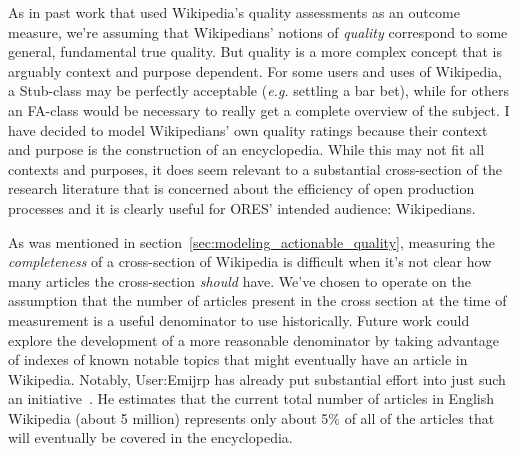 As in past work that used Wikipedia's quality assessments as an outcome measure, we're assuming that Wikipedians' notions of \emph{quality} correspond to some general, fundamental true quality.  But quality is a more complex concept that is arguably context and purpose dependent.  For some users and uses of Wikipedia, a Stub-class may be perfectly acceptable (\emph{e.g.} settling a bar bet), while for others an FA-class would be necessary to really get a complete overview of the subject.  I have decided to model Wikipedians' own quality ratings because their context and purpose is the construction of an encyclopedia.  While this may not fit all contexts and purposes, it does seem relevant to a substantial cross-section of the research literature that is concerned about the efficiency of open production processes and it is clearly useful for ORES' intended audience: Wikipedians.

As was mentioned in section~\ref{sec:modeling_actionable_quality}, measuring the \emph{completeness} of a cross-section of Wikipedia is difficult when it's not clear how many articles the cross-section \emph{should} have.  We've chosen to operate on the assumption that the number of articles present in the cross section at the time of measurement is a useful denominator to use historically.  Future work could explore the development of a more reasonable denominator by taking advantage of indexes of known notable topics that might eventually have an article in Wikipedia.  Notably, User:Emijrp has already put substantial effort into just such an initiative~\cite{emijrp17all}.  He estimates that the current total number of articles in English Wikipedia (about 5 million) represents only about 5\% of all of the articles that will eventually be covered in the encyclopedia.
